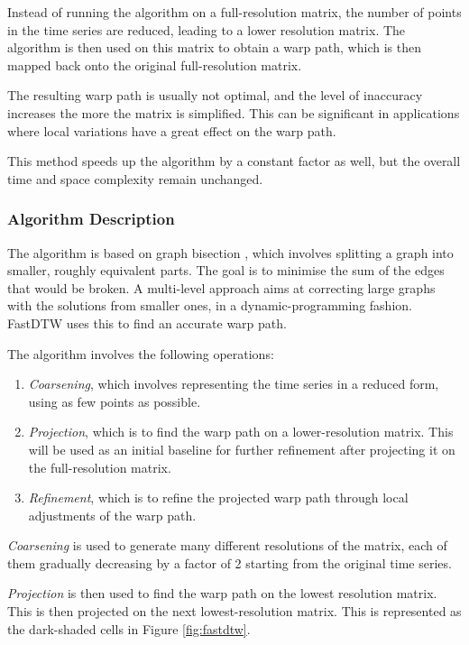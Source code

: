 \documentclass[final,rdr32.tex]{subfiles}
\begin{document}
Instead of running the algorithm on a full-resolution matrix, the number of points in the time series are reduced, leading to a lower resolution matrix. The algorithm is then used on this matrix to obtain a warp path, which is then mapped back onto the original full-resolution matrix.

The resulting warp path is usually not optimal, and the level of inaccuracy increases the more the matrix is simplified. This can be significant in applications where local variations have a great effect on the warp path.

This method speeds up the algorithm by a constant factor as well, but the overall time and space complexity remain unchanged.

\subsubsection{Algorithm Description}

The algorithm is based on graph bisection \cite{karypis1997multilevel}, which involves splitting a graph into smaller, roughly equivalent parts. The goal is to minimise the sum of the edges that would be broken. A multi-level approach aims at correcting large graphs with the solutions from smaller ones, in a dynamic-programming fashion. FastDTW uses this to find an accurate warp path.

The algorithm involves the following operations:
\begin{enumerate}
    \item \textit{Coarsening}, which involves representing the time series in a reduced form, using as few points as possible.
    \item \textit{Projection}, which is to find the warp path on a lower-resolution matrix. This will be used as an initial baseline for further refinement after projecting it on the full-resolution matrix.
    \item \textit{Refinement}, which is to refine the projected warp path through local adjustments of the warp path.
\end{enumerate}

\textit{Coarsening} is used to generate many different resolutions of the matrix, each of them gradually decreasing by a factor of 2 starting from the original time series.

\textit{Projection} is then used to find the warp path on the lowest resolution matrix. This is then projected on the next lowest-resolution matrix. This is represented as the dark-shaded cells in Figure \ref{fig:fastdtw}.
\end{document}
